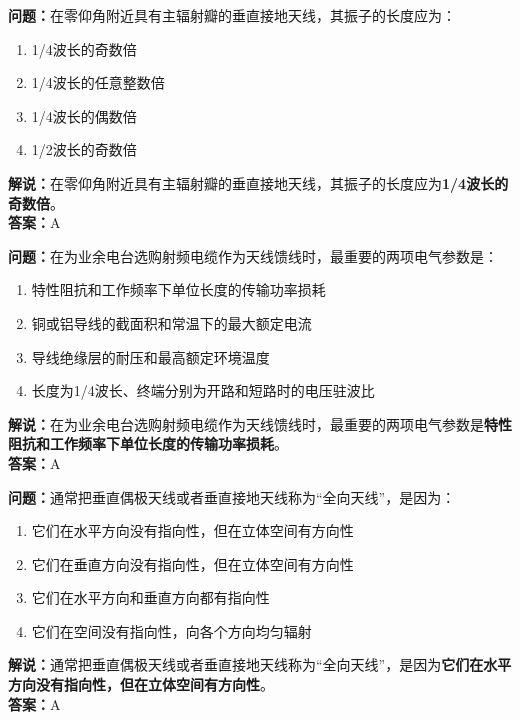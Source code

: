 \textbf{问题：}在零仰角附近具有主辐射瓣的垂直接地天线，其振子的长度应为：

\begin{enumerate}[label=\Alph*), leftmargin=1cm]
	\item 1/4波长的奇数倍
	\item 1/4波长的任意整数倍
	\item 1/4波长的偶数倍
	\item 1/2波长的奇数倍
\end{enumerate}

\textbf{解说：}在零仰角附近具有主辐射瓣的垂直接地天线，其振子的长度应为\textbf{1/4波长的奇数倍}。\\\textbf{答案：}A%



\textbf{问题：}在为业余电台选购射频电缆作为天线馈线时，最重要的两项电气参数是：

\begin{enumerate}[label=\Alph*), leftmargin=1cm]
	\item 特性阻抗和工作频率下单位长度的传输功率损耗
	\item 铜或铝导线的截面积和常温下的最大额定电流
	\item 导线绝缘层的耐压和最高额定环境温度
	\item 长度为1/4波长、终端分别为开路和短路时的电压驻波比
\end{enumerate}

\textbf{解说：}在为业余电台选购射频电缆作为天线馈线时，最重要的两项电气参数是\textbf{特性阻抗和工作频率下单位长度的传输功率损耗}。\\\textbf{答案：}A%



\textbf{问题：}通常把垂直偶极天线或者垂直接地天线称为“全向天线”，是因为：

\begin{enumerate}[label=\Alph*), leftmargin=1cm]
	\item 它们在水平方向没有指向性，但在立体空间有方向性
	\item 它们在垂直方向没有指向性，但在立体空间有方向性
	\item 它们在水平方向和垂直方向都有指向性
	\item 它们在空间没有指向性，向各个方向均匀辐射
\end{enumerate}

\textbf{解说：}通常把垂直偶极天线或者垂直接地天线称为“全向天线”，是因为\textbf{它们在水平方向没有指向性，但在立体空间有方向性}。\\\textbf{答案：}A%



